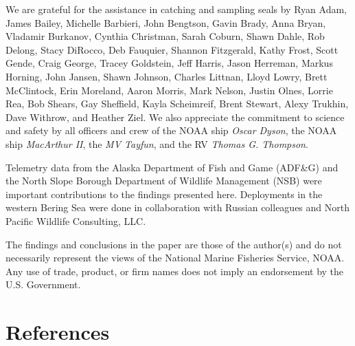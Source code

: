 \documentclass[fleqn,10pt,lineno]{wlpeerj} %
\begin{document}
We are grateful for the assistance in catching and sampling seals by Ryan Adam,
James Bailey, Michelle Barbieri, John Bengtson, Gavin Brady, Anna Bryan,
Vladamir Burkanov, Cynthia Christman, Sarah Coburn, Shawn Dahle, Rob Delong,
Stacy DiRocco, Deb Fauquier, Shannon Fitzgerald, Kathy Frost, Scott Gende, Craig
George, Tracey Goldstein, Jeff Harris, Jason Herreman, Markus Horning, John
Jansen, Shawn Johnson, Charles Littnan, Lloyd Lowry, Brett McClintock, Erin
Moreland, Aaron Morris, Mark Nelson, Justin Olnes, Lorrie Rea, Bob Shears, Gay
Sheffield, Kayla Scheimreif, Brent Stewart, Alexy Trukhin, Dave Withrow, and
Heather Ziel. We also appreciate the commitment to science and safety by all
officers and crew of the NOAA ship \emph{Oscar Dyson}, the NOAA ship \emph{MacArthur II},
the \emph{MV Tayfun}, and the RV \emph{Thomas G. Thompson}.

Telemetry data from the Alaska Department of Fish and Game (ADF\&G) and the North
Slope Borough Department of Wildlife Management (NSB) were important
contributions to the findings presented here. Deployments in the western Bering
Sea were done in collaboration with Russian colleagues and North Pacific
Wildlife Consulting, LLC.

The findings and conclusions in the paper are those of the author(s) and do not
necessarily represent the views of the National Marine Fisheries Service, NOAA.
Any use of trade, product, or firm names does not imply an endorsement by the
U.S. Government.

\section*{References}\label{references}
\end{document}
